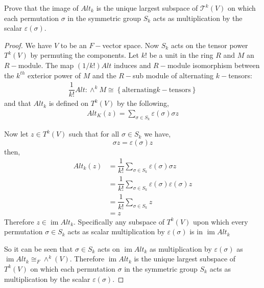 \documentclass[11pt]{article}
\newenvironment{problem}[2][Problem\!]{\begin{tcolorbox}\begin{trivlist}
\item[\hskip \labelsep {\bfseries #1}\hskip \labelsep {\bfseries #2}]}{\end{trivlist}\end{tcolorbox}}
\newcommand{\im}{\operatorname{im}} %
\newcommand{\set}[1]{\left\{#1\right\}} %
\renewcommand{\epsilon}{\varepsilon}
\begin{document}
\begin{problem} {11.5.11}
    Prove that the image of $Alt_k$ is the unique largest subspace of $\mathcal{T}^{k}(V)$ on which each permutation $\sigma$ in the symmetric group $S_k$ acts as multiplication by the scalar $\epsilon (\sigma)$. 
\end{problem}
\begin{proof}
    We have $V$ to be an $F-$vector space. Now $S_k$ acts on the tensor power $T^{k}(V)$ by permuting the components. Let $k!$ be a unit in the ring $R$ and $M$ an $R-$module. The map $(1/k!)Alt$ induces and $R-$module isomorphism between the $k^{th}$ exterior power of $M$ and the $R-$sub module of alternating $k-$tensors:
    \begin{align*}
        \dfrac{1}{k!}Alt: \wedge^{k}M \cong \set{\text{alternating} k-\text{tensors}}
    \end{align*}
    and that $Alt_k$ is defined on $T^{k}(V)$ by the following,
    \begin{align*}
        Alt_K(z) = \sum_{\sigma \in S_k}\epsilon(\sigma)\sigma z
    \end{align*}

    Now let $z \in T^{k}(V)$ such that for all $\sigma \in S_k$ we have,
    \[\sigma z = \epsilon(\sigma)z\]
    then,
    \begin{align*}
        Alt_k(z) &= \dfrac{1}{k!}\sum_{\sigma \in S_k}\epsilon(\sigma)\sigma z \\ 
        &= \dfrac{1}{k!} \sum_{\sigma \in S_k}\epsilon(\sigma)\epsilon(\sigma)z \\
        &= \dfrac{1}{k!}\sum_{\sigma \in S_k}z \\
        &= z
    \end{align*}
    Therefore $z \in \im Alt_k$. Specifically any subspace of $T^{k}(V)$ upon which every permutation $\sigma\in S_k$ acts as scalar multiplication by $\epsilon(\sigma)$ is in $\im Alt_k$

    So it can be seen that $\sigma \in S_k$ acts on $\im Alt_k$ as multiplication by $\epsilon(\sigma)$ as $\im Alt_k \cong_F \wedge^{k}(V)$. Therefore $\im Alt_k$ is the unique largest subspace of $T^{k}(V)$ on which each permutation $\sigma$ in the symmetric group $S_k$ acts as multiplication by the scalar $\epsilon (\sigma)$. 
\end{proof}

\vspace*{15pt}
\end{document}
